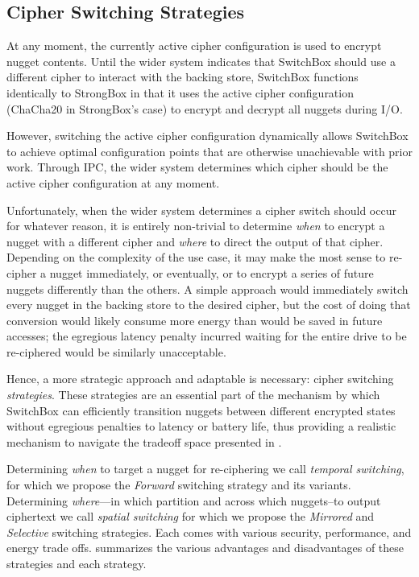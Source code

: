 \subsection{Cipher Switching Strategies}

At any moment, the currently active cipher configuration is used to encrypt
nugget contents. Until the wider system indicates that SwitchBox should use a
different cipher to interact with the backing store, SwitchBox functions
identically to StrongBox in that it uses the active cipher configuration
(ChaCha20 in StrongBox's case) to encrypt and decrypt all nuggets during I/O.

However, switching the active cipher configuration dynamically allows SwitchBox
to achieve optimal configuration points that are otherwise unachievable with
prior work. Through IPC, the wider system determines which cipher should be the
active cipher configuration at any moment.

Unfortunately, when the wider system determines a cipher switch should occur for
whatever reason, it is entirely non-trivial to determine \emph{when} to encrypt
a nugget with a different cipher and \emph{where} to direct the output of that
cipher. Depending on the complexity of the use case, it may make the most sense
to re-cipher a nugget immediately, or eventually, or to encrypt a series of
future nuggets differently than the others. A simple approach would immediately
switch every nugget in the backing store to the desired cipher, but the cost of
doing that conversion would likely consume more energy than would be saved in
future accesses; the egregious latency penalty incurred waiting for the entire
drive to be re-ciphered would be similarly unacceptable.

Hence, a more strategic approach and adaptable is necessary: cipher switching
\emph{strategies}. These strategies are an essential part of the mechanism by
which SwitchBox can efficiently transition nuggets between different encrypted
states without egregious penalties to latency or battery life, thus providing a
realistic mechanism to navigate the tradeoff space presented in
.

Determining \emph{when} to target a nugget for re-ciphering we call
\emph{temporal switching}, for which we propose the \emph{Forward} switching
strategy and its variants. Determining \emph{where}---in which partition and
across which nuggets--to output ciphertext we call \emph{spatial switching} for
which we propose the \emph{Mirrored} and \emph{Selective} switching strategies.
Each comes with various security, performance, and energy trade offs.
 summarizes the various advantages and
disadvantages of these strategies and each strategy.

